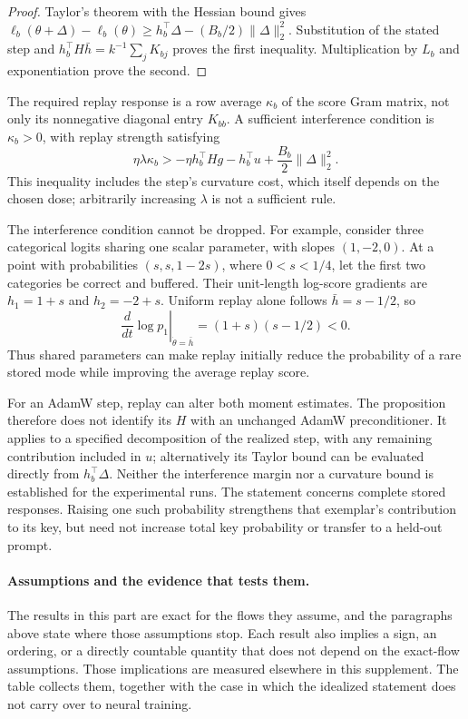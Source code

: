 \begin{proof}
\enforcehalffinalproseline
Taylor's theorem with the Hessian bound gives
$\ell_b(\theta+\Delta)-\ell_b(\theta)
 \ge h_b^\top\Delta-(B_b/2)\|\Delta\|_2^2$.
Substitution of the stated step and
$h_b^\top H\bar h=k^{-1}\sum_jK_{bj}$ proves the first inequality.
Multiplication by $L_b$ and exponentiation prove the second.
\end{proof}

The required replay response is a row average $\kappa_b$ of the score Gram
matrix, not only its nonnegative diagonal entry $K_{bb}$. A sufficient
interference condition is $\kappa_b>0$, with replay strength satisfying
\[
 \eta\lambda\kappa_b>
   -\eta h_b^\top Hg-h_b^\top u
       +\frac{B_b}{2}\|\Delta\|_2^2.
\]
This inequality includes the step's curvature cost, which itself depends on
the chosen dose; arbitrarily increasing $\lambda$ is not a sufficient rule.

The interference condition cannot be dropped. For example, consider three
categorical logits sharing one scalar parameter, with slopes $(1,-2,0)$.
At a point with probabilities $(s,s,1-2s)$, where $0<s<1/4$, let the first
two categories be correct and buffered. Their unit-length log-score gradients
are $h_1=1+s$ and $h_2=-2+s$. Uniform replay alone follows
$\bar h=s-1/2$, so
\[
 \left.\frac{d}{dt}\log p_1\right|_{\dot\theta=\bar h}
   =(1+s)(s-1/2)<0.
\]
Thus shared parameters can make replay initially reduce the probability of
a rare stored mode while improving the average replay score.

For an AdamW step, replay can alter both moment estimates. The proposition
therefore does not identify its $H$ with an unchanged AdamW preconditioner.
It applies to a specified decomposition of the realized step, with any
remaining contribution included in $u$; alternatively its Taylor bound can
be evaluated directly from $h_b^\top\Delta$. Neither the interference margin
nor a curvature bound is established for the experimental runs.
The statement concerns complete stored responses. Raising one such
probability strengthens that exemplar's contribution to its key, but need
not increase total key probability or transfer to a held-out prompt.

\paragraph{Assumptions and the evidence that tests them.}
The results in this part are exact for the flows they assume, and the
paragraphs above state where those assumptions stop. Each result also implies a sign,
an ordering, or a directly countable quantity that does not depend on the
exact-flow assumptions. Those implications are measured elsewhere in this
supplement. The table collects them, together with the case in which the
idealized statement does not carry over to neural training.

